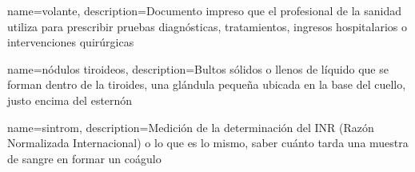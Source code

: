 {
    name={volante},
    description={Documento impreso que el profesional de la sanidad utiliza para prescribir pruebas diagnósticas, tratamientos, ingresos hospitalarios o intervenciones quirúrgicas}
}

{
    name={nódulos tiroideos},
    description={Bultos sólidos o llenos de líquido que se forman dentro de la tiroides, una glándula pequeña ubicada en la base del cuello, justo encima del esternón}
}

{
    name={sintrom},
    description={Medición de la determinación del INR (Razón Normalizada Internacional) o lo que es lo mismo, saber
    cuánto tarda una muestra de sangre en formar un coágulo}
}